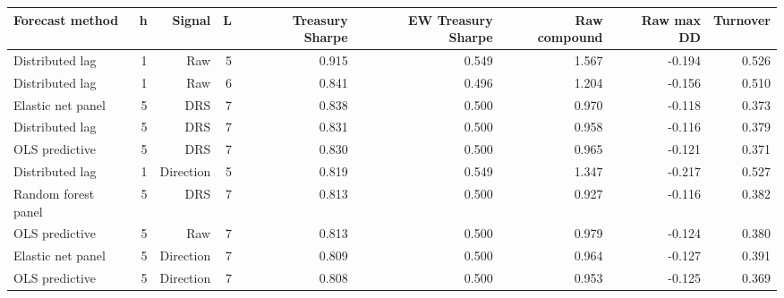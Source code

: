 \begin{tabular}{lrrrrrrrr}
\toprule
Forecast method & h & Signal & L & Treasury Sharpe & EW Treasury Sharpe & Raw compound & Raw max DD & Turnover \\
\midrule
Distributed lag & 1 & Raw & 5 & 0.915 & 0.549 & 1.567 & -0.194 & 0.526 \\
Distributed lag & 1 & Raw & 6 & 0.841 & 0.496 & 1.204 & -0.156 & 0.510 \\
Elastic net panel & 5 & DRS & 7 & 0.838 & 0.500 & 0.970 & -0.118 & 0.373 \\
Distributed lag & 5 & DRS & 7 & 0.831 & 0.500 & 0.958 & -0.116 & 0.379 \\
OLS predictive & 5 & DRS & 7 & 0.830 & 0.500 & 0.965 & -0.121 & 0.371 \\
Distributed lag & 1 & Direction & 5 & 0.819 & 0.549 & 1.347 & -0.217 & 0.527 \\
Random forest panel & 5 & DRS & 7 & 0.813 & 0.500 & 0.927 & -0.116 & 0.382 \\
OLS predictive & 5 & Raw & 7 & 0.813 & 0.500 & 0.979 & -0.124 & 0.380 \\
Elastic net panel & 5 & Direction & 7 & 0.809 & 0.500 & 0.964 & -0.127 & 0.391 \\
OLS predictive & 5 & Direction & 7 & 0.808 & 0.500 & 0.953 & -0.125 & 0.369 \\
\bottomrule
\end{tabular}
